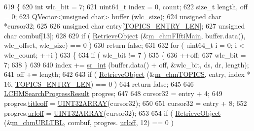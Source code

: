 \begin{DoxyCode}
619 \{
620     \textcolor{keywordtype}{int} wlc\_bit = 7;
621     uint64\_t index = 0, count;
622     \textcolor{keywordtype}{size\_t} length, off = 0;
623     QVector<unsigned char> buffer (wlc\_size);
624     \textcolor{keywordtype}{unsigned} \textcolor{keywordtype}{char} *cursor32;
625 
626     \textcolor{keywordtype}{unsigned} \textcolor{keywordtype}{char} entry[\hyperlink{libchmfileimpl_8cpp_aee75fb5b9a986eae20d17ffa638c98e4}{TOPICS\_ENTRY\_LEN}];
627     \textcolor{keywordtype}{unsigned} \textcolor{keywordtype}{char} combuf[13];
628 
629     \textcolor{keywordflow}{if} ( \hyperlink{classLCHMFileImpl_a8535dce5eb8f22161ecf3510fde8aa4e}{RetrieveObject} (&\hyperlink{classLCHMFileImpl_aff4c9c66f19b11205e4cbdabc7b2d8aa}{m\_chmFIftiMain}, buffer.data(), wlc\_offset, wlc\_size) 
      == 0 )
630         \textcolor{keywordflow}{return} \textcolor{keyword}{false};
631 
632     \textcolor{keywordflow}{for} ( uint64\_t i = 0; i < wlc\_count; ++i )
633     \{
634         \textcolor{keywordflow}{if} ( wlc\_bit != 7 )
635         \{
636             ++off;
637             wlc\_bit = 7;
638         \}
639 
640         index += \hyperlink{bitfiddle_8h_a43e8ade332d40ce66a429ba61e1827cc}{sr\_int} (buffer.data() + off, &wlc\_bit, ds, dr, length);
641         off += length;
642 
643         \textcolor{keywordflow}{if} ( \hyperlink{classLCHMFileImpl_a8535dce5eb8f22161ecf3510fde8aa4e}{RetrieveObject} (&\hyperlink{classLCHMFileImpl_ae4a2d92d948b4482781b6b539ff1dd75}{m\_chmTOPICS}, entry, index * 16, 
      \hyperlink{libchmfileimpl_8cpp_aee75fb5b9a986eae20d17ffa638c98e4}{TOPICS\_ENTRY\_LEN}) == 0 )
644             \textcolor{keywordflow}{return} \textcolor{keyword}{false};
645 
646         \hyperlink{classLCHMSearchProgressResult}{LCHMSearchProgressResult} progres;
647 
648         cursor32 = entry + 4;
649         progres.\hyperlink{classLCHMSearchProgressResult_a19efd6e530de64b24d8241e63879b10e}{titleoff} = \hyperlink{bitfiddle_8h_a09e5156ae22f7b3ea6e8fe0f94084390}{UINT32ARRAY}(cursor32);
650 
651         cursor32 = entry + 8;
652         progres.\hyperlink{classLCHMSearchProgressResult_a5adc806eecbe534531e56d8c3bec9bee}{urloff} = \hyperlink{bitfiddle_8h_a09e5156ae22f7b3ea6e8fe0f94084390}{UINT32ARRAY}(cursor32);
653 
654         \textcolor{keywordflow}{if} ( \hyperlink{classLCHMFileImpl_a8535dce5eb8f22161ecf3510fde8aa4e}{RetrieveObject} (&\hyperlink{classLCHMFileImpl_a6570c3bf72f4ed7ee5992005a88320c9}{m\_chmURLTBL}, combuf, progres.
      \hyperlink{classLCHMSearchProgressResult_a5adc806eecbe534531e56d8c3bec9bee}{urloff}, 12) == 0 )

\end{DoxyCode}
